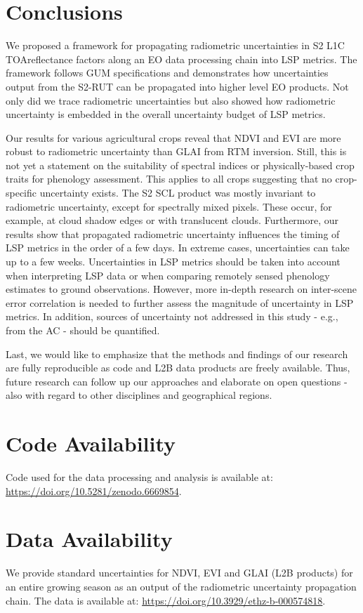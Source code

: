 \section{Conclusions}
\label{sec:unc_conclusions}

We proposed a framework for propagating radiometric uncertainties in \gls{S2} L1C \gls{TOA}reflectance factors along an \gls{EO} data processing chain into \gls{LSP} metrics. The framework follows GUM specifications and demonstrates how uncertainties output from the \gls{S2-RUT} can be propagated into higher level \gls{EO} products. Not only did we trace radiometric uncertainties but also showed how radiometric uncertainty is embedded in the overall uncertainty budget of \gls{LSP} metrics.

Our results for various agricultural crops reveal that \gls{NDVI} and \gls{EVI} are more robust to radiometric uncertainty than \gls{GLAI} from RTM inversion. Still, this is not yet a statement on the suitability of spectral indices or physically-based crop traits for phenology assessment. This applies to all crops suggesting that no crop-specific uncertainty exists. The \gls{S2} \gls{SCL} product was mostly invariant to radiometric uncertainty, except for spectrally mixed pixels. These occur, for example, at cloud shadow edges or with translucent clouds. Furthermore, our results show that propagated radiometric uncertainty influences the timing of \gls{LSP} metrics in the order of a few days. In extreme cases, uncertainties can take up to a few weeks. Uncertainties in \gls{LSP} metrics should be taken into account when interpreting \gls{LSP} data or when comparing remotely sensed phenology estimates to ground observations. However, more in-depth research on inter-scene error correlation is needed to further assess the magnitude of uncertainty in \gls{LSP} metrics. In addition, sources of uncertainty not addressed in this study - e.g., from the AC - should be quantified.

Last, we would like to emphasize that the methods and findings of our research are fully reproducible as code and L2B data products are freely available. Thus, future research can follow up our approaches and elaborate on open questions - also with regard to other disciplines and geographical regions.

\section*{Code Availability}
Code used for the data processing and analysis is available at: \url{https://doi.org/10.5281/zenodo.6669854}.

\section*{Data Availability}
We provide standard uncertainties for NDVI, \gls{EVI} and \gls{GLAI} (L2B products) for an entire growing season as an output of the radiometric uncertainty propagation chain. The data is available at: \url{https://doi.org/10.3929/ethz-b-000574818}.
